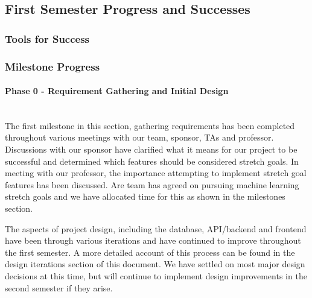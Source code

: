 \subsection{First Semester Progress and Successes}
\subsubsection{Tools for Success}
\subsubsection{Milestone Progress}
\paragraph{Phase 0 - Requirement Gathering and Initial Design} \mbox{}\\[\paragraphheaderspace]
The first milestone in this section, gathering requirements has been completed throughout various meetings with our team, sponsor, TAs and professor. Discussions with our sponsor have clarified what it means for our project to be successful and determined which features should be considered stretch goals. In meeting with our professor, the importance attempting to implement stretch goal features has been discussed. Are team has agreed on pursuing machine learning stretch goals and we have allocated time for this as shown in the milestones section.\par
The aspects of project design, including the database, API/backend and frontend have been through various iterations and have continued to improve throughout the first semester. A more detailed account of this process can be found in the design iterations section of this document. We have settled on most major design decisions at this time, but will continue to implement design improvements in the second semester if they arise.\par
